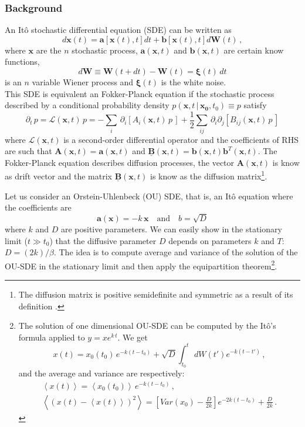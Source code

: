 \documentclass[10pt,a4paper]{article}
\begin{document}
\subsubsection{Background}
An It\^o stochastic differential equation (SDE) can be written as
\[
  d\mathbf{x}(t)=\mathbf{a} \left[\mathbf{x}(t),t\right] dt+\mathbf{b}\left[\mathbf{x}(t),t\right] d\mathbf{W}(t)\,,
\]
where $\mathbf{x}$ are the $n$ stochastic process, $\mathbf{a}(\mathbf{x},t)$ and $\mathbf{b}(\mathbf{x},t)$ are certain know functions, 
\[
  d\mathbf{W}\equiv \mathbf{W}(t+dt)-\mathbf{W}(t)=\boldsymbol{\xi}(t)\,dt
\] 
is an $n$ variable Wiener process and $\boldsymbol{\xi}(t)$ is the white noise.\\
This SDE is equivalent an Fokker-Planck equation if the stochastic process described by a conditional probability density $p(\mathbf{x},t\,|\,\mathbf{x_0},t_0)\equiv p$ satisfy 
\[
  \partial_t\,p=\mathscr{L}(\mathbf{x},t)\,p
     =-\sum_i\,\partial_i\left[ A_i(\mathbf{x},t)\,p\, \right]+\frac{1}{2}\sum_{ij}\,\partial_i\partial_j\left[ B_{ij}(\mathbf{x},t)\,p\, \right] 
\]
where $\mathscr{L}(\mathbf{x},t)$ is a second-order differential operator and the coefficients of RHS are such that $\mathbf{A}(\mathbf{x},t)=\mathbf{a}(\mathbf{x},t)$ and $\underline{\mathbf{B}}(\mathbf{x},t)=\mathbf{b}(\mathbf{x},t)\textbf{b}^T(\mathbf{x},t)$. The Fokker-Planck equation describes diffusion processes, the vector $\mathbf{A}(\mathbf{x},t)$ is know as drift vector and the matrix $\underline{\mathbf{B}}(\mathbf{x},t)$ is know as the diffusion matrix\footnote{The diffusion matrix is positive semidefinite and symmetric as a result of its definition \cite{Gard:HandBookStocMet}.}. 

Let us consider an Orstein-Uhlenbeck (OU) SDE, that is, an It\^o equation where the coefficients are
\[
 \mathbf{a}(\mathbf{x})=-k\,\mathbf{x}\quad\text{and}\quad b=\sqrt{D}
\]
where $k$ and $D$ are positive parameters. We can easily show in the stationary limit ($t\gg t_0$) that the diffusive parameter $D$ depends on parameters $k$ and $T$: $D=(2k)/\beta$. The idea is to compute average and variance of the solution of the OU-SDE in the stationary limit and then apply the equipartition theorem\footnote{The solution of one dimensional OU-SDE can be computed by the It\^o's formula applied to $y=xe^{k\,t}$\cite{Gard:HandBookStocMet}. We get 
\[
 x(t)=x_0(t_0)\,e^{-k(t-t_0)}+\sqrt{D}\int_{t_0}^t\,dW(t')e^{-k(t-t')}\,,
\]
and the average and variance are respectively:
\begin{gather*}
 \left\langle x(t)\right\rangle=\left\langle x_0(t_0)\right\rangle\,e^{-k(t-t_0)}\,, \\
 \left\langle \left(x(t)-\left\langle x(t)\right\rangle\right)^2\right\rangle=\left[ Var(x_0)-\frac{D}{2k} \right]e^{-2k(t-t_0)}+\frac{D}{2k}\,.
\end{gather*}
}.
\end{document}
